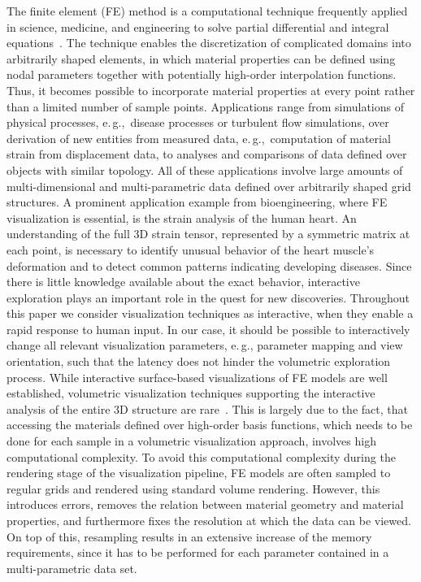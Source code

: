 \documentclass[journal]{vgtc}                %
\begin{document}
The finite element (FE) method is a computational technique frequently applied in science, medicine, and engineering to solve partial differential and integral equations~\cite{Young00}. The technique enables the discretization of complicated domains into arbitrarily shaped elements, in which material properties can be defined using nodal parameters together with potentially high-order interpolation functions. Thus, it becomes possible to incorporate material properties at every point rather than a limited number of sample points. Applications range from simulations of physical processes, e.\,g.,~disease processes or turbulent flow simulations, over derivation of new entities from measured data, e.\,g.,~computation of material strain from displacement data, to analyses and comparisons of data defined over objects with similar topology. All of these applications involve large amounts of multi-dimensional and multi-parametric data defined over arbitrarily shaped grid structures. A prominent application example from bioengineering, where FE visualization is essential, is the strain analysis of the human heart. An understanding of the full 3D strain tensor, represented by a symmetric matrix at each point, is necessary to identify unusual behavior of the heart muscle's deformation and to detect common patterns indicating developing diseases. Since there is little knowledge available about the exact behavior, interactive exploration plays an important role in the quest for new discoveries. Throughout this paper we consider visualization techniques as interactive, when they enable a rapid response to human input. In our case, it should be possible to interactively change all relevant visualization parameters, e.\,g., parameter mapping and view orientation, such that the latency does not hinder the volumetric exploration process. While interactive surface-based visualizations of FE models are well established, volumetric visualization techniques supporting the interactive analysis of the entire 3D structure are rare~\cite{Wihelms90}. This is largely due to the fact, that accessing the materials defined over high-order basis functions, which needs to be done for each sample in a volumetric visualization approach, involves high computational complexity. To avoid this computational complexity during the rendering stage of the visualization pipeline, FE models are often sampled to regular grids and rendered using standard volume rendering. However, this introduces errors, removes the relation between material geometry and material properties, and furthermore fixes the resolution at which the data can be viewed. On top of this, resampling results in an extensive increase of the memory requirements, since it has to be performed for each parameter contained in a multi-parametric data set.
\end{document}
